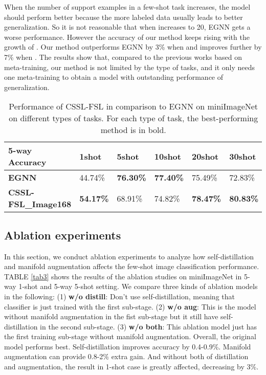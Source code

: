 \documentclass[conference]{IEEEtran}
\begin{document}
When the number of support examples in a few-shot task increases, the model should perform better because the more labeled data usually leads to better generalization. So it is not reasonable that when  increases to 20, EGNN gets a worse performance. However the accuracy of our method keeps rising with the growth of . Our method outperforms EGNN by 3\% when  and improves further by 7\% when . The results show that, compared to the previous works based on meta-training, our method is not limited by the type of tasks, and it only needs one meta-training to obtain a model with outstanding performance of generalization.
\begin{table}[htbp]
\caption{Performance of CSSL-FSL in comparison to EGNN on miniImageNet on different types of tasks. For each type of task, the best-performing method is in bold.}
\begin{center}
\begin{tabular}{l p{0.7cm}<{\centering} p{0.7cm}<{\centering} p{0.8cm}<{\centering} p{0.8cm}<{\centering} p{0.8cm}<{\centering}}
\hline
\textbf{5-way Accuracy}&\textbf{1shot}&\textbf{5shot}&\textbf{10shot} &\textbf{20shot} &\textbf{30shot} \\
\hline
\textbf{EGNN} &	44.74\%	&\textbf{76.30\%}	&\textbf{77.40\%}	&75.49\%	&72.83\% \\
\textbf{CSSL-FSL\_Image168}	&\textbf{54.17\%}	&68.91\%	&74.82\%	&\textbf{78.47\%}	&\textbf{80.83\%} \\
\hline
\end{tabular}
\label{tab2}
\end{center}
\end{table}

\subsection{Ablation experiments}
In this section, we conduct ablation experiments to analyze how self-distillation and manifold augmentation affects the few-shot image classification performance. 
TABLE \ref{tab3} shows the results of the ablation studies on miniImageNet in 5-way 1-shot and 5-way 5-shot setting. We compare three kinds of ablation models in the following: (1) \textbf{w/o distill}: Don’t use self-distillation, meaning that classifier is just trained with the first sub-stage. (2) \textbf{w/o aug}: This is the model without manifold augmentation in the fist sub-stage but it still have self-distillation in the second sub-stage. (3) \textbf{w/o both}: This ablation model just has the first training sub-stage without manifold augmentation. Overall, the original model performs best. Self-distillation improves accuracy by 0.4-0.9\%. Manifold augmentation can provide 0.8-2\% extra gain. And without both of distillation and augmentation, the result in 1-shot case is greatly affected, decreasing by 3\%.
\end{document}
